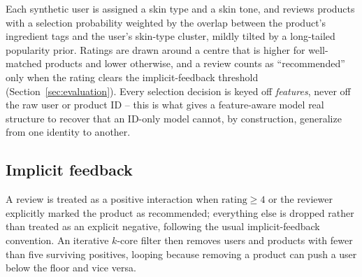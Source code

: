 Each synthetic user is assigned a skin type and a skin tone, and reviews
products with a selection probability weighted by the overlap between the
product's ingredient tags and the user's skin-type cluster, mildly tilted by
a long-tailed popularity prior. Ratings are drawn around a centre that is
higher for well-matched products and lower otherwise, and a review counts as
``recommended'' only when the rating clears the implicit-feedback threshold
(Section~\ref{sec:evaluation}). Every selection decision is keyed off
\emph{features}, never off the raw user or product ID -- this is what gives
a feature-aware model real structure to recover that an ID-only model
cannot, by construction, generalize from one identity to another.

\subsection{Implicit feedback}

A review is treated as a positive interaction when
$\text{rating} \geq 4$ or the reviewer explicitly marked the product as
recommended; everything else is dropped rather than treated as an explicit
negative, following the usual implicit-feedback convention. An iterative
$k$-core filter then removes users and products with fewer than five
surviving positives, looping because removing a product can push a user
below the floor and vice versa.

